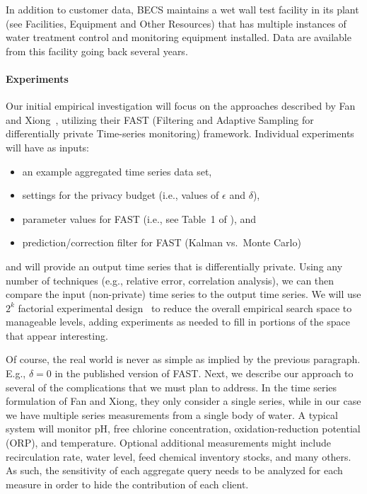 In addition to customer data, BECS maintains a wet wall test facility in
its plant (see Facilities, Equipment and Other Resources) that has multiple
instances of water treatment control and monitoring equipment installed.
Data are available from this facility going back several years.

\paragraph{Experiments}
Our initial empirical investigation will focus on the approaches
described by Fan and Xiong~\cite{fx12,fx14}, utilizing their
FAST (Filtering and Adaptive Sampling for differentially private
Time-series monitoring) framework. Individual experiments will have
as inputs:
\begin{itemize}
\item an example aggregated time series data set,
\item settings for the privacy budget
(i.e., values of $\epsilon$ and $\delta$),
\item parameter values for FAST (i.e., see Table~1 of \cite{fx14}), and
\item prediction/correction filter for FAST (Kalman vs.~Monte Carlo)
\end{itemize}
and will provide an output time series that is differentially private.
Using any number of techniques (e.g., relative error, correlation analysis), 
we can then compare the input (non-private) time series to the output
time series.
We will use $2^k$ factorial experimental design~\cite{Jain91}
to reduce the overall empirical search space to manageable levels,
adding experiments as needed to fill in portions of the space that
appear interesting.

Of course, the real world is never as simple as implied by the previous
paragraph.  E.g., $\delta= 0$ in the published version of FAST.
Next, we describe our approach to several of the
complications that we must plan to address.
In the time series formulation of Fan and Xiong, they only consider
a single series, while in our case we have multiple series measurements
from a single body of water.  A typical system will monitor pH,
free chlorine concentration, oxidation-reduction potential (ORP),
and temperature.
Optional additional measurements might include recirculation rate, water level,
feed chemical inventory stocks, and many others.
As such,
the sensitivity of each aggregate query needs to be analyzed
for each measure in order to hide the contribution of each client.

